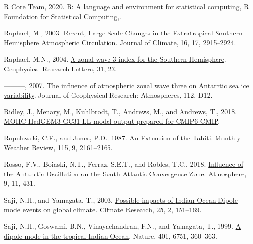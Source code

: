 \documentclass[12pt,oneside]{reedthesis}
\newlength{\cslhangindent}
\newenvironment{CSLReferences}[2] %
 {%
  \setlength{\parindent}{0pt}
  \ifodd #1 \everypar{\setlength{\hangindent}{\cslhangindent}}\ignorespaces\fi
  \ifnum #2 > 0
  \setlength{\parskip}{#2\baselineskip}
  \fi
 }%
 {}
\begin{document}
\begin{CSLReferences}{1}{0}
\leavevmode{}%
R Core Team, 2020. R: {A} language and environment for statistical computing, {R Foundation for Statistical Computing},.

\leavevmode{}%
Raphael, M., 2003. \href{https://doi.org/10.1175/1520-0442(2003)016\%3C2915:RLCITE\%3E2.0.CO;2}{Recent, {Large-Scale Changes} in the {Extratropical Southern Hemisphere Atmospheric Circulation}}. Journal of Climate, 16, 17, 2915--2924.

\leavevmode{}%
Raphael, M.N., 2004. \href{https://doi.org/10.1029/2004GL020365}{A zonal wave 3 index for the {Southern Hemisphere}}. Geophysical Research Letters, 31, 23.

\leavevmode{}%
---------, 2007. \href{https://doi.org/10.1029/2006JD007852}{The influence of atmospheric zonal wave three on {Antarctic} sea ice variability}. Journal of Geophysical Research: Atmospheres, 112, D12.

\leavevmode{}%
Ridley, J., Menary, M., Kuhlbrodt, T., Andrews, M., and Andrews, T., 2018. \href{https://doi.org/10.22033/ESGF/CMIP6.419}{MOHC HadGEM3-GC31-LL model output prepared for CMIP6 CMIP}.

\leavevmode{}%
Ropelewski, C.F., and Jones, P.D., 1987. \href{https://doi.org/10.1175/1520-0493(1987)115\%3C2161:AEOTTS\%3E2.0.CO;2}{An {Extension} of the {Tahiti}}. Monthly Weather Review, 115, 9, 2161--2165.

\leavevmode{}%
Rosso, F.V., Boiaski, N.T., Ferraz, S.E.T., and Robles, T.C., 2018. \href{https://doi.org/10.3390/atmos9110431}{Influence of the {Antarctic Oscillation} on the {South Atlantic Convergence Zone}}. Atmosphere, 9, 11, 431.

\leavevmode{}%
Saji, N.H., and Yamagata, T., 2003. \href{https://doi.org/10.3354/cr025151}{Possible impacts of {Indian Ocean Dipole} mode events on global climate}. Climate Research, 25, 2, 151--169.

\leavevmode{}%
Saji, N.H., Goswami, B.N., Vinayachandran, P.N., and Yamagata, T., 1999. \href{https://doi.org/10.1038/43854}{A dipole mode in the tropical {Indian Ocean}}. Nature, 401, 6751, 360--363.


\end{CSLReferences}
\end{document}
